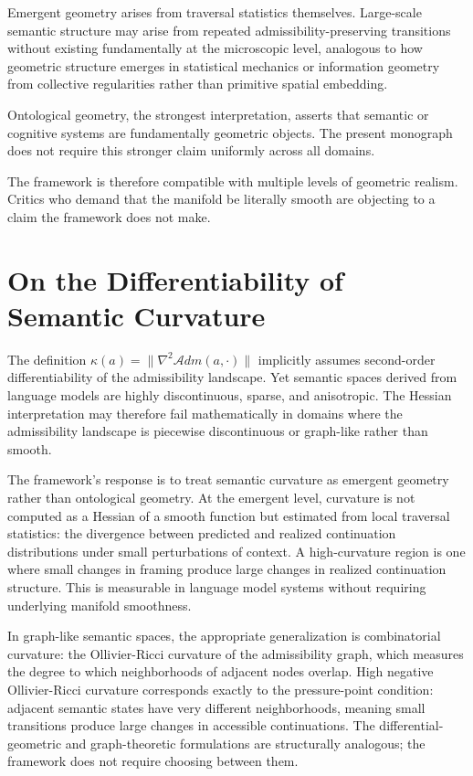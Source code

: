\documentclass[12pt,oneside]{book}
\theoremstyle{plain}
\theoremstyle{definition}
\theoremstyle{plain}
\begin{document}
Emergent geometry arises from traversal statistics themselves. Large-scale semantic structure may arise from repeated admissibility-preserving transitions without existing fundamentally at the microscopic level, analogous to how geometric structure emerges in statistical mechanics or information geometry from collective regularities rather than primitive spatial embedding.

Ontological geometry, the strongest interpretation, asserts that semantic or cognitive systems are fundamentally geometric objects. The present monograph does not require this stronger claim uniformly across all domains.

The framework is therefore compatible with multiple levels of geometric realism. Critics who demand that the manifold be literally smooth are objecting to a claim the framework does not make.

\section{On the Differentiability of Semantic Curvature}

The definition $\kappa(a) = \|\nabla^2 \mathcal{A}dm(a, \cdot)\|$ implicitly assumes second-order differentiability of the admissibility landscape. Yet semantic spaces derived from language models are highly discontinuous, sparse, and anisotropic. The Hessian interpretation may therefore fail mathematically in domains where the admissibility landscape is piecewise discontinuous or graph-like rather than smooth.

The framework's response is to treat semantic curvature as emergent geometry rather than ontological geometry. At the emergent level, curvature is not computed as a Hessian of a smooth function but estimated from local traversal statistics: the divergence between predicted and realized continuation distributions under small perturbations of context. A high-curvature region is one where small changes in framing produce large changes in realized continuation structure. This is measurable in language model systems without requiring underlying manifold smoothness.

In graph-like semantic spaces, the appropriate generalization is combinatorial curvature: the Ollivier-Ricci curvature of the admissibility graph, which measures the degree to which neighborhoods of adjacent nodes overlap. High negative Ollivier-Ricci curvature corresponds exactly to the pressure-point condition: adjacent semantic states have very different neighborhoods, meaning small transitions produce large changes in accessible continuations. The differential-geometric and graph-theoretic formulations are structurally analogous; the framework does not require choosing between them.
\end{document}
